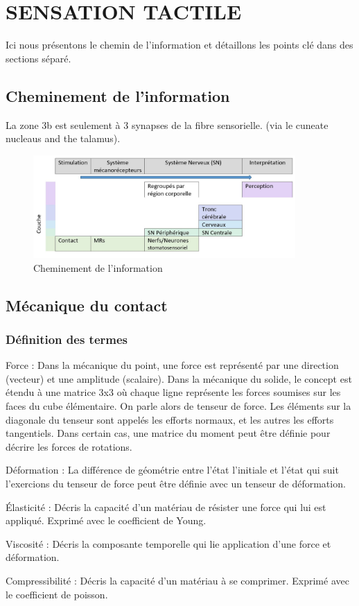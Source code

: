 \chapter{SENSATION TACTILE}
Ici nous présentons le chemin de l’information et détaillons les points clé dans des sections séparé.\par

\section{Cheminement de l’information}
La zone 3b est seulement à 3 synapses de la fibre sensorielle. (via le cuneate nucleaus and the talamus).\par
\begin{figure}[!h]
	\centering
	\includegraphics[width=10cm]{Photos/chemin.jpg}
	\caption{Cheminement de l’information}\label{chemin_info}
\end{figure}

\section{Mécanique du contact}

\subsection{Définition des termes}
Force : Dans la mécanique du point, une force est représenté par une direction (vecteur) et une amplitude (scalaire). Dans la mécanique du solide, le concept est étendu à une matrice 3x3 où chaque ligne représente les forces soumises sur les faces du cube élémentaire. On parle alors de tenseur de force. Les éléments sur la diagonale du tenseur sont appelés les efforts normaux, et les autres les efforts tangentiels. Dans certain cas, une matrice du moment peut être définie pour décrire les forces de rotations.\par
Déformation : La différence de géométrie entre l’état l’initiale et l’état qui suit l’exercions  du tenseur de force peut être définie avec un tenseur de déformation.\par
Élasticité : Décris la capacité d’un matériau de résister une force qui lui est appliqué. Exprimé avec le coefficient de Young.\par
Viscosité : Décris la composante temporelle qui lie application d’une force et déformation.\par
Compressibilité : Décris la capacité d’un matériau à se comprimer. Exprimé avec le coefficient de poisson.\par

